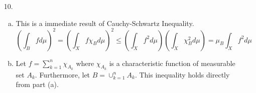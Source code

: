 \begin{itemize}
		\item[10.] \begin{enumerate}[(a)]
			\item This is a immediate result of Cauchy-Schwartz Inequality.
			$$
			\left(\int_B f d\mu\right)^2 = \left(\int_X f\chi_B d\mu\right)^2 \le \left(\int_X f^2d\mu  \right)\left(\int_X \chi_B^2d\mu \right) = \mu_B \int_X f^2d\mu 
			$$
			
			\item Let $f = \sum_{k=1}^n \chi_{A_k}$ where $\chi_{A_k}$ is a characteristic function of measurable set $A_k$. Furthermore, let $B =\cup_{k=1}^nA_k$. This inequality holds directly from part (a). 
		\end{enumerate}
\end{itemize}
